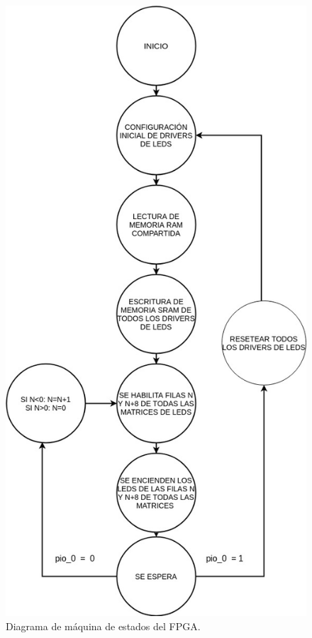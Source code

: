 \begin{figure}[htpb]
	\centering
	\includegraphics[scale=0.6]{Figures/maquinaestados.jpg} 
	\caption{Diagrama de máquina de estados del FPGA.}
	\label{fig: diagrama estados}
\end{figure}







